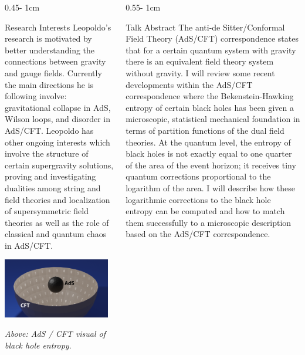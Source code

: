 \documentclass{../psuposter}
\begin{document}
\begin{frame}
\begin{columns}
\begin{column}{0.45\textwidth - 1cm}
    \begin{block}{Research Interests}
        Leopoldo's research is motivated by better understanding the connections between gravity and gauge fields. Currently the main directions he is following involve: gravitational collapse in AdS, Wilson loops, and disorder in AdS/CFT. Leopoldo has other ongoing interests which involve the structure of certain supergravity solutions, proving and investigating dualities among string and field theories and localization of supersymmetric field theories as well as the role of classical and quantum chaos in AdS/CFT. \cite{LeopoldoPandoZayas}
        \begin{center}
	    	\includegraphics[width=0.95\textwidth]{images/ads-cft-blackhole}    		
    	\end{center}
    	\textit{Above: AdS / CFT visual of black hole entropy}. \cite{baggioliGravityHolographyApplications}
    \end{block}
\end{column}

\begin{column}{0.55\textwidth - 1cm}


    \begin{block}{Talk Abstract}
        The anti-de Sitter/Conformal Field Theory (AdS/CFT) correspondence states that for a certain quantum system with gravity there is an equivalent field theory system without gravity.  I will review some recent developments within the AdS/CFT correspondence where the Bekenstein-Hawking entropy of certain black holes has been given a microscopic, statistical mechanical foundation in terms of partition functions of the dual field theories. At the quantum level, the entropy of black holes is not exactly equal to one quarter of the area of the event horizon; it receives tiny quantum corrections proportional to the logarithm of the area. I will describe how these logarithmic corrections to the black hole entropy can be computed and how to match them successfully to a microscopic description based on the AdS/CFT correspondence.  
    \end{block}



\end{column}
\end{columns}
\end{frame}
\end{document}
